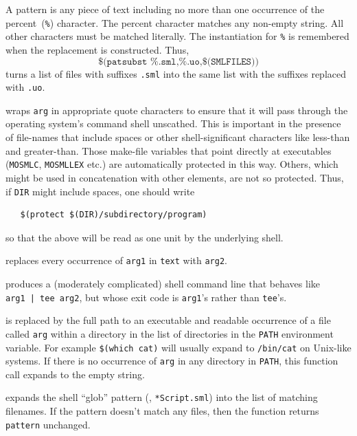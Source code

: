 \begin{description}
  A pattern is any piece of text including no more than one occurrence
  of the percent~(\texttt{\%}) character.  The percent character
  matches any non-empty string.  All other characters must be matched
  literally.  The instantiation for \texttt{\%} is remembered when the
  replacement is constructed.  Thus, \[
    \texttt{\$(patsubst \%.sml,\%.uo,\$(SMLFILES))}
   \] turns a list of files with suffixes \texttt{.sml} into the same
  list with the suffixes replaced with \texttt{.uo}.
\item[\texttt{\$(protect arg)}] wraps \texttt{arg} in appropriate
  quote characters to ensure that it will pass through the operating
  system's command shell unscathed.  This is important in the presence
  of file-names that include spaces or other shell-significant
  characters like less-than and greater-than.  Those make-file
  variables that point directly at executables (\texttt{MOSMLC},
  \texttt{MOSMLLEX} etc.) are automatically protected in this way.
  Others, which might be used in concatenation with other elements,
  are not so protected.  Thus, if \texttt{DIR} might include spaces,
  one should write
\begin{verbatim}
   $(protect $(DIR)/subdirectory/program)
\end{verbatim}
  so that the above will be read as one unit by the underlying shell.
\item[\texttt{\$(subst arg1,arg2,text)}] replaces every occurrence
  of \texttt{arg1} in \texttt{text} with \texttt{arg2}.
\item[\texttt{\$(tee arg1,arg2)}] produces a (moderately complicated) shell command line that behaves like \texttt{arg1~|~tee~arg2}, but whose exit code is \texttt{arg1}'s rather than \texttt{tee}'s.
\item[\texttt{\$(which arg)}] is replaced by the full path to an executable and readable occurrence of a file called \texttt{arg} within a directory in the list of directories in the \texttt{PATH} environment variable.
For example \texttt{\$(which cat)} will usually expand to \texttt{/bin/cat} on Unix-like systems.
If there is no occurrence of \texttt{arg} in any directory in \texttt{PATH}, this function call expands to the empty string.
\item[\texttt{\$(wildcard pattern)}] expands the shell ``glob'' pattern (\eg, \texttt{*Script.sml}) into the list of matching filenames.
If the pattern doesn't match any files, then the function returns \texttt{pattern} unchanged.
\end{description}

